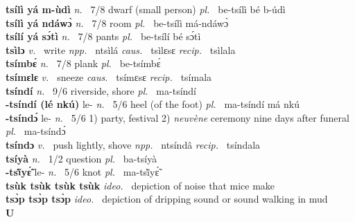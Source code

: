 {\bfseries tsílì yá m-ùdì}  {\itshape n.~} 7/8 dwarf (small person) {\itshape pl.~} be-tsílì bé b-údì    \\ 
{\bfseries tsílì yá ndáwɔ̀}  {\itshape n.~} 7/8 room {\itshape pl.~} be-tsílì má-ndáwɔ̀    \\ 
{\bfseries tsílí yá sɔ́tì}  {\itshape n.~} 7/8  pants {\itshape pl.~} be-tsílí bé sɔ́tì    \\ 
{\bfseries tsìlɔ}  {\itshape v.~} write   {\itshape npp.~} ntsìlá {\itshape caus.~} tsìlɛsɛ {\itshape recip.~} tsìlala  \\ 
{\bfseries tsímbɛ́}  {\itshape n.~} 7/8 plank {\itshape pl.~} be-tsímbɛ́    \\ 
{\bfseries tsímɛlɛ}  {\itshape v.~} sneeze   {\itshape caus.~} tsímɛsɛ {\itshape recip.~} tsímala  \\ 
{\bfseries tsíndí}  {\itshape n.~} 9/6 riverside, shore {\itshape pl.~} ma-tsíndí    \\ 
{\bfseries -tsíndí (lé nkú)} le- {\itshape n.~} 5/6 heel (of the foot) {\itshape pl.~} ma-tsíndí má nkú    \\ 
{\bfseries -tsíndɔ́} le- {\itshape n.~} 5/6 1) party, festival 2) {\itshape neuvène} ceremony nine days after funeral {\itshape pl.~} ma-tsíndɔ́    \\ 
{\bfseries tsíndɔ}  {\itshape v.~} push lightly, shove   {\itshape npp.~} ntsíndâ {\itshape recip.~} tsíndala  \\ 
{\bfseries tsíyà}  {\itshape n.~} 1/2 question {\itshape pl.~} ba-tsíyà    \\ 
{\bfseries -tsĩ̀yɛ̃́} le- {\itshape n.~} 5/6 knot {\itshape pl.~} ma-tsĩ̀yɛ̃́    \\ 
{\bfseries tsùk tsùk tsùk tsùk}  {\itshape ideo.~} depiction of noise that mice make    \\ 
{\bfseries tsɔ̀p tsɔ̀p tsɔ̀p}  {\itshape ideo.~} depiction of dripping sound or sound walking in mud    \\ 

\medskip
\noindent \large {\bfseries U}\normalsize\\
\medskip

